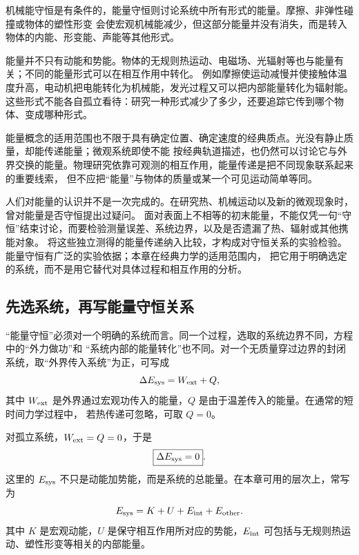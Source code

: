 机械能守恒是有条件的，能量守恒则讨论系统中所有形式的能量。摩擦、非弹性碰撞或物体的塑性形变
会使宏观机械能减少，但这部分能量并没有消失，而是转入物体的内能、形变能、声能等其他形式。

能量并不只有动能和势能。物体的无规则热运动、电磁场、光辐射等也与能量有关；不同的能量形式可以在相互作用中转化。
例如摩擦使运动减慢并使接触体温度升高，电动机把电能转化为机械能，发光过程又可以把内部能量转化为辐射能。
这些形式不能各自孤立看待：研究一种形式减少了多少，还要追踪它传到哪个物体、变成哪种形式。

能量概念的适用范围也不限于具有确定位置、确定速度的经典质点。光没有静止质量，却能传递能量；微观系统即使不能
按经典轨道描述，也仍然可以讨论它与外界交换的能量。物理研究依靠可观测的相互作用，能量传递是把不同现象联系起来的重要线索，
但不应把“能量”与物体的质量或某一个可见运动简单等同。

人们对能量的认识并不是一次完成的。在研究热、机械运动以及新的微观现象时，曾对能量是否守恒提出过疑问。
面对表面上不相等的初末能量，不能仅凭一句“守恒”结束讨论，而要检验测量误差、系统边界，以及是否遗漏了热、辐射或其他携能对象。
将这些独立测得的能量传递纳入比较，才构成对守恒关系的实验检验。能量守恒有广泛的实验依据；本章在经典力学的适用范围内，
把它用于明确选定的系统，而不是用它替代对具体过程和相互作用的分析。

\subsection{先选系统，再写能量守恒关系}

“能量守恒”必须对一个明确的系统而言。同一个过程，选取的系统边界不同，方程中的“外力做功”和
“系统内部的能量转化”也不同。对一个无质量穿过边界的封闭系统，取“外界传入系统”为正，可写成
\begin{equation}
  \Delta E_{\rm sys}=W_{\rm ext}+Q,
  \label{eq:general-energy-account}
\end{equation}
其中 $W_{\rm ext}$ 是外界通过宏观功传入的能量，$Q$ 是由于温差传入的能量。在通常的短时间力学过程中，
若热传递可忽略，可取 $Q=0$。

对孤立系统，$W_{\rm ext}=Q=0$，于是
\begin{equation}
  \boxed{\Delta E_{\rm sys}=0}.
  \label{eq:isolated-energy}
\end{equation}
这里的 $E_{\rm sys}$ 不只是动能加势能，而是系统的总能量。在本章可用的层次上，常写为
\begin{equation}
  E_{\rm sys}=K+U+E_{\rm int}+E_{\rm other}.
  \label{eq:energy-components}
\end{equation}
其中 $K$ 是宏观动能，$U$ 是保守相互作用所对应的势能，$E_{\rm int}$ 可包括与无规则热运动、塑性形变等相关的内部能量。

